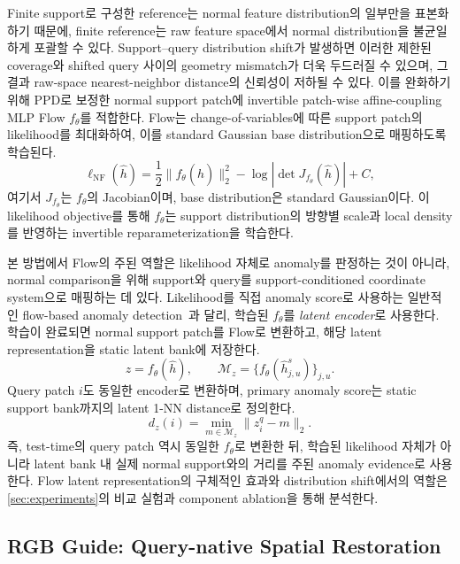 Finite support로 구성한 reference는 normal feature distribution의 일부만을
표본화하기 때문에, finite reference는 raw feature space에서 normal distribution을
불균일하게 포괄할 수 있다. Support--query distribution shift가 발생하면 이러한
제한된 coverage와 shifted query 사이의 geometry mismatch가 더욱 두드러질 수 있으며,
그 결과 raw-space nearest-neighbor distance의 신뢰성이 저하될 수 있다. 이를
완화하기 위해 PPD로 보정한 normal support patch에 invertible patch-wise
affine-coupling MLP Flow $f_\theta$를 적합한다. Flow는 change-of-variables에 따른
support patch의 likelihood를 최대화하여, 이를 standard Gaussian base distribution으로
매핑하도록 학습된다.
\begin{equation}
  \ell_{\mathrm{NF}}(\widehat h)
    =\frac{1}{2}\lVert f_\theta(\widehat h)\rVert_2^2
     -\log\left|\det J_{f_\theta}(\widehat h)\right|+C,
  \label{eq:flow_nll}
\end{equation}
여기서 $J_{f_\theta}$는 $f_\theta$의 Jacobian이며, base distribution은 standard
Gaussian이다. 이 likelihood objective를 통해 $f_\theta$는 support distribution의
방향별 scale과 local density를 반영하는 invertible reparameterization을 학습한다.

본 방법에서 Flow의 주된 역할은 likelihood 자체로 anomaly를 판정하는 것이 아니라,
normal comparison을 위해 support와 query를 support-conditioned coordinate system으로
매핑하는 데 있다.
Likelihood를 직접 anomaly score로 사용하는 일반적인 flow-based anomaly
detection~\cite{gudovskiy2022cflow}과 달리, 학습된 $f_\theta$를
\emph{latent encoder}로 사용한다. 학습이 완료되면 normal support patch를 Flow로
변환하고, 해당 latent representation을 static latent bank에 저장한다.
\begin{equation}
  z=f_\theta(\widehat h),
  \qquad
  \mathcal{M}_z=\{f_\theta(\widehat h_{j,u}^s)\}_{j,u}.
  \label{eq:latent_bank}
\end{equation}
Query patch $i$도 동일한 encoder로 변환하며, primary anomaly score는 static
support bank까지의 latent 1-NN distance로 정의한다.
\begin{equation}
  d_z(i)=\min_{m\in\mathcal{M}_z}\|z_i^q-m\|_2.
  \label{eq:latent_nn}
\end{equation}
즉, test-time의 query patch 역시 동일한 $f_\theta$로 변환한 뒤, 학습된 likelihood
자체가 아니라 latent bank 내 실제 normal support와의 거리를 주된 anomaly
evidence로 사용한다. Flow latent representation의 구체적인 효과와
distribution shift에서의 역할은 \cref{sec:experiments}의 비교 실험과 component
ablation을 통해 분석한다.

\subsection{RGB Guide: Query-native Spatial Restoration}
\label{sec:rgb_guide}

